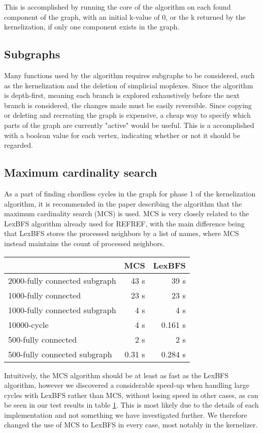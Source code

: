 \documentclass{article}
\begin{document}
		This is accomplished by running the core of the algorithm on each found component of the graph, with an initial k-value of 0, or the k returned by the kernelization, if only one component exists in the graph.

		\subsection{Subgraphs}
		Many functions used by the algorithm requires subgraphs to be considered, such as the kernelization and the deletion of simplicial moplexes.
		Since the algorithm is depth-first, meaning each branch is explored exhaustively before the next branch is considered, the changes made must be easily reversible.
		Since copying or deleting and recreating the graph is expensive, a cheap way to specify which parts of the graph are currently "active" would be useful.
		This is a accomplished with a boolean value for each vertex, indicating whether or not it should be regarded.

		\subsection{Maximum cardinality search}
		\label{subsec:maximum-cardinality-search}
		As a part of finding chordless cycles in the graph for phase 1 of the kernelization algorithm, it is recommended in the paper describing the algorithm\cite{kernel} that the maximum cardinality search (MCS) is used.
		MCS is very closely related to the LexBFS algorithm already used for REFREF, with the main difference being that LexBFS stores the processed neighbors by a list of names, where MCS instead maintains the count of processed neighbors.

		\begin{table}[!ht]
			\begin{tabular}{| l | r | r |}
			\hline
											& MCS 		& LexBFS 	\\ \hline
			2000-fully connected subgraph	& 43 s  	& 39 s 		\\ \hline
			1000-fully connected 			& 23 s 		& 23 s 		\\ \hline
			1000-fully connected subgraph	& 4 s   	& 4 s 		\\ \hline
			10000-cycle 					& 4 s   	& 0.161 s 	\\ \hline 
			500-fully connected 			& 2 s   	& 2 s 		\\ \hline 
			500-fully connected subgraph 	& 0.31 s 	& 0.284 s 	\\ \hline 
			\end{tabular}
			\label{table:maximum-cardinality-search}
		\end{table}
		Intuitively, the MCS algorithm should be at least as fast as the LexBFS algorithm, however we discovered a considerable speed-up when handling large cycles with LexBFS rather than MCS, without losing speed in other cases, as can be seen in our test results in table \ref{table:maximum-cardinality-search}.
		This is most likely due to the details of each implementation and not something we have investigated further.
		We therefore changed the use of MCS to LexBFS in every case, most notably in the kernelizer.
\end{document}

